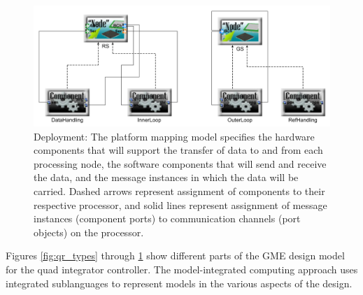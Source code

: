\begin{figure}
\centering
\includegraphics[width=0.9\columnwidth]{figures/quadrotor_hw_mapping.png}
    \caption{Deployment: The platform mapping model specifies the hardware
components that will support the transfer of data to and from each processing
node, the software components that will send and receive the data, and the
message instances in which the data will be carried.  Dashed arrows represent
assignment of components to their respective processor, and solid lines
represent assignment of message instances (component ports) to communication
channels (port objects) on the processor.}
    \label{fig:qr_hw_mapping}
\end{figure}


Figures \ref{fig:qr_types} through \ref{fig:qr_hw_mapping} show different parts of
the GME design model for the quad integrator controller.  The model-integrated
computing approach uses integrated sublanguages to represent models in the
various aspects of the design.

